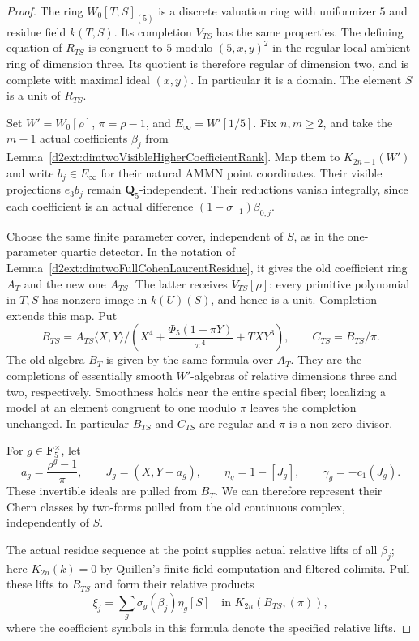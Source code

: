 \begin{proof}
The ring $W_0[T,S]_{(5)}$ is a discrete valuation ring with
uniformizer $5$ and residue field $k(T,S)$.  Its completion
$V_{TS}$ has the same properties.  The defining equation of
$R_{TS}$ is congruent to $5$ modulo $(5,x,y)^2$ in the regular
local ambient ring of dimension three.  Its quotient is
therefore regular of dimension two, and is complete with
maximal ideal $(x,y)$.  In particular it is a domain.
The element $S$ is a unit of $R_{TS}$.

Set $W'=W_0[\rho]$, $\pi=\rho-1$, and
$E_\infty=W'[1/5]$.  Fix $n,m\geq2$, and take the $m-1$
actual coefficients $\beta_j$ from
Lemma~\ref{d2ext:dimtwoVisibleHigherCoefficientRank}.
Map them to $K_{2n-1}(W')$ and write $b_j\in E_\infty$
for their natural AMMN point coordinates.  Their visible
projections $e_3b_j$ remain $\mathbf Q_5$-independent.
Their reductions vanish integrally, since each coefficient
is an actual difference $(1-\sigma_{-1})\beta_{0,j}$.

Choose the same finite parameter cover, independent of $S$,
as in the one-parameter quartic detector.  In the notation of
Lemma~\ref{d2ext:dimtwoFullCohenLaurentResidue}, it gives the old
coefficient ring $A_T$ and the new one $A_{TS}$.  The latter
receives $V_{TS}[\rho]$: every primitive polynomial in $T,S$
has nonzero image in $k(U)(S)$, and hence is a unit.  Completion
extends this map.  Put
\[
 B_{TS}=A_{TS}\langle X,Y\rangle/
 \left(X^4+\frac{\Phi_5(1+\pi Y)}{\pi^4}+TXY^3\right),
 \qquad C_{TS}=B_{TS}/\pi.
\]
The old algebra $B_T$ is given by the same formula over $A_T$.
They are the completions of essentially smooth $W'$-algebras
of relative dimensions three and two, respectively.
Smoothness holds near the entire special fiber; localizing a
model at an element congruent to one modulo $\pi$ leaves the
completion unchanged.  In particular $B_{TS}$ and $C_{TS}$
are regular and $\pi$ is a non-zero-divisor.

For $g\in\mathbf F_5^\times$, let
\[
 a_g=\frac{\rho^g-1}{\pi},\qquad
 J_g=(X,Y-a_g),\qquad
 \eta_g=1-[J_g],\qquad \gamma_g=-c_1(J_g).
\]
These invertible ideals are pulled from $B_T$.  We can therefore
represent their Chern classes by two-forms pulled from the old
continuous complex, independently of $S$.

The actual residue sequence at the point supplies actual
relative lifts of all $\beta_j$; here
$K_{2n}(k)=0$ by Quillen's finite-field computation and filtered
colimits.  Pull these lifts to $B_{TS}$ and form their relative
products
\[
 \xi_j=\sum_g\sigma_g(\beta_j)\eta_g[S]
       \quad\text{in }K_{2n}(B_{TS},(\pi)),
\]
where the coefficient symbols in this formula denote the
specified relative lifts.


\end{proof}
